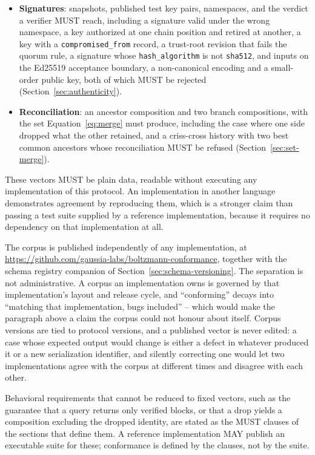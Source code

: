 \documentclass[11pt,a4paper]{article}
\begin{document}
\begin{itemize}[leftmargin=1.4em]
  \item \textbf{Signatures}: snapshots, published test key pairs, namespaces,
and the verdict a verifier MUST reach, including a signature valid under the
wrong namespace, a key authorized at one chain position and retired at
another, a key with a \texttt{compromised\_from} record, a trust-root revision
that fails the quorum rule, a signature whose \texttt{hash\_algorithm} is not
\texttt{sha512}, and inputs on the Ed25519 acceptance boundary, a
non-canonical encoding and a small-order public key, both of which MUST be
rejected (Section~\ref{sec:authenticity}).
  \item \textbf{Reconciliation}: an ancestor composition and two branch
compositions, with the set Equation~\ref{eq:merge} must produce, including the
case where one side dropped what the other retained, and a criss-cross history
with two best common ancestors whose reconciliation MUST be refused
(Section~\ref{sec:set-merge}).
\end{itemize}

These vectors MUST be plain data, readable without executing any implementation
of this protocol. An implementation in another language demonstrates agreement
by reproducing them, which is a stronger claim than passing a test suite
supplied by a reference implementation, because it requires no dependency on
that implementation at all.

The corpus is published independently of any implementation, at
\url{https://github.com/gaussia-labs/boltzmann-conformance}, together with the
schema registry companion of Section~\ref{sec:schema-versioning}. The separation
is not administrative. A corpus an implementation owns is governed by that
implementation's layout and release cycle, and ``conforming'' decays into
``matching that implementation, bugs included'' -- which would make the paragraph
above a claim the corpus could not honour about itself. Corpus versions are tied
to protocol versions, and a published vector is never edited: a case whose
expected output would change is either a defect in whatever produced it or a new
serialization identifier, and silently correcting one would let two
implementations agree with the corpus at different times and disagree with each
other.

Behavioral requirements that cannot be reduced to fixed vectors, such as the
guarantee that a query returns only verified blocks, or that a drop yields a
composition excluding the dropped identity, are stated as the MUST clauses of
the sections that define them. A reference implementation MAY publish an
executable suite for these; conformance is defined by the clauses, not by the
suite.
\end{document}

